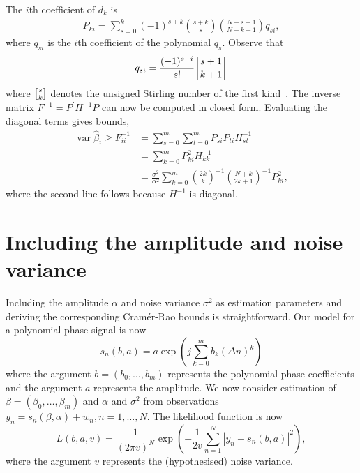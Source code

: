 \documentclass[review]{elsarticle}
\newcommand{\var}{\operatorname{var}}
\newcommand{\abs}[1]{{\left| #1 \right|}}
\begin{document}
The $i$th coefficient of $d_k$ is
\begin{align*}
P_{ki} = \sum_{s=0}^k{(-1)^{s+k}\binom{s+k}{s}\binom{N-s-1}{N-k-1}q_{si}},
\end{align*}
where $q_{si}$ is the $i$th coefficient of the polynomial $q_s$.  Observe that
\[
q_{si} = \frac{(-1)^{s-i}}{s!}\stirling{s+1}{k+1}
\]
where $\stirling{s}{k}$ denotes the unsigned Stirling number of the first kind~\cite{Abramowitz_Stegen_stirling_numbers_1972}.  
The inverse matrix $F^{-1} = P^\prime H^{-1} P$ can now be computed in closed form.  Evaluating the diagonal terms gives bounds,
\begin{align*}
\var \hat{\beta}_i \geq F_{ii}^{-1} &=  \sum_{s=0}^{m}\sum_{t=0}^{m} P_{si} P_{ti}  H_{st}^{-1} \\
&=  \sum_{k=0}^{m} P_{ki}^2  H_{kk}^{-1} \\
&= \frac{\sigma^2}{\alpha^2} \sum_{k=0}^{m} \binom{2k}{k}^{-1} \binom{N+k}{2k+1}^{-1} P_{ki}^2,
\end{align*}
where the second line follows because $H^{-1}$ is diagonal.
 

\section{Including the amplitude and noise variance}\label{sec:including-amplitude}

Including the amplitude $\alpha$ and noise variance $\sigma^2$ as estimation parameters and deriving the corresponding Cram\'{e}r-Rao bounds is straightforward.  Our model for a polynomial phase signal is now
\[
s_n(b,a) = a \exp\left( j \sum_{k = 0}^{m}{b_k (\Delta n)^k}\right)
\]
where the argument $b=(b_0, \dots, b_m)$ represents the polynomial phase coefficients and the argument $a$ represents the amplitude.  We now consider estimation of $\beta = (\beta_0, \dots, \beta_m)$ and $\alpha$ and $\sigma^2$  from observations $y_n = s_n(\beta,\alpha) + w_n, n = 1,\dots,N$.  The likelihood function is now
\[
L(b,a,v) = \frac{1}{(2 \pi v )^N} \exp\left( - \frac{1}{2 v } \sum_{n=1}^N \abs{y_n -  s_n(b,a) }^2 \right),
\]
where the argument $v$ represents the (hypothesised) noise variance.
\end{document}
